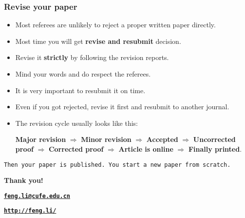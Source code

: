 \documentclass[10pt]{beamer}
\begin{document}
\begin{frame}
  \frametitle{Revise your paper}
  \begin{itemize}
  \item Most referees  are unlikely to reject a proper written paper directly.
  \item Most time you will get \textbf{revise and resubmit} decision.
  \item Revise it \textbf{strictly} by following the revision reports.
  \item Mind your words and do respect the referees.
  \item It is very important to resubmit it on time.
  \item Even if you got rejected, revise it first and resubmit to another journal.
  \item The revision cycle usually looks like this:

    \textbf{Major revision} $\Rightarrow$ \textbf{Minor revision} $\Rightarrow$
    \textbf{Accepted} $\Rightarrow$ \textbf{Uncorrected proof} $\Rightarrow$
    \textbf{Corrected proof} $\Rightarrow$ \textbf{Article is online}
    $\Rightarrow$ \textbf{Finally printed}.
  \end{itemize}

\end{frame}


\begin{frame}[plain]
  \begin{center}
    \texttt{Then your paper is published. You start a new paper from scratch.
    }
\end{center}
\end{frame}

\begin{frame}[plain]
  \addtocounter{framenumber}{-1}
  \begin{center}
    {\color{SUblue} \textbf{\Huge Thank you!}}
    \vspace{1cm}

    {\texttt{\textbf{\url{feng.li@cufe.edu.cn}}}}

    \vspace{1cm}

    {\texttt{\textbf{\url{http://feng.li/}}}}

  \end{center}
\end{frame}
\end{document}
